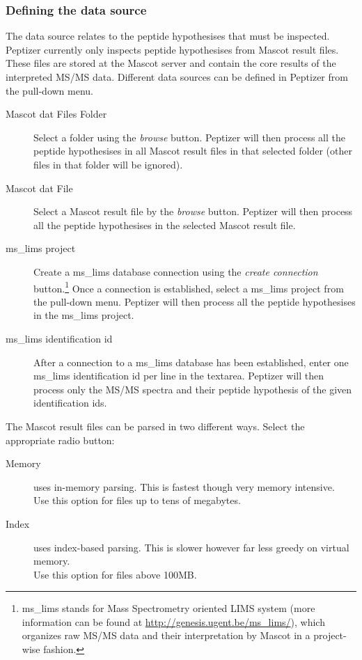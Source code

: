 \subsubsection{Defining the data source}
%
\npar The data source relates to the peptide hypothesises that must be inspected. Peptizer currently only inspects peptide hypothesises from Mascot result files. These files are stored at the Mascot server and contain the core results of the interpreted MS/MS data. Different data sources can be defined in Peptizer from the pull-down menu.
\begin{description}
	\item[Mascot dat Files Folder ] Select a folder using the \textit{browse} button. Peptizer will then process all the peptide hypothesises in all Mascot result files in that selected folder (other files in that folder will be ignored).
	\item[Mascot dat File ] Select a Mascot result file by the \textit{browse} button. Peptizer will then process all the peptide hypothesises in the selected Mascot result file.
	\item[ms\_lims project] Create a ms\_lims database connection using the \textit{create connection} button.\footnote{ms\_lims stands for Mass Spectrometry oriented LIMS system (more information can be found at \url{http://genesis.ugent.be/ms_lims/}), which organizes raw MS/MS data and their interpretation by Mascot in a project-wise fashion.} Once a connection is established, select a ms\_lims project from the pull-down menu. Peptizer will then process all the peptide hypothesises in the ms\_lims project.
	\item[ms\_lims identification id] After a connection to a ms\_lims database has been established, enter one ms\_lims identification id per line in the textarea. Peptizer will then process only the MS/MS spectra and their peptide hypothesis of the given identification ids.
\end{description}
\npar The Mascot result files can be parsed in two different ways. Select the appropriate radio button:
\begin{description}
	\item[Memory] uses in-memory parsing. This is fastest though very memory intensive.\\Use this option for files up to tens of megabytes.
	\item[Index] uses index-based parsing. This is slower however far less greedy on virtual memory.\\Use this option for files above 100MB.
\end{description}

